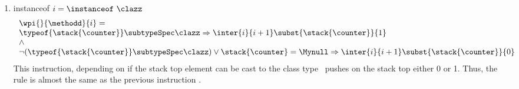 \begin{itemize}
\begin{enumerate}
						\item instanceof $i = \instanceof \  \clazz  $
						$$ \begin{array}{l}
                                                    \wpi{} {\methodd}{i}  = \\
							 \typeof{ \stack{\counter}} \subtypeSpec \clazz  \Rightarrow 
								 \inter{i}{i+1} \subst{ \stack{\counter } } {  1  } \\
									 \wedge \\
							\neg (  \typeof{\stack{\counter}} \subtypeSpec  \clazz  )  \vee  \stack{\counter} = \Mynull \Rightarrow 
							   \inter{i}{i+1} \subst{  \stack{\counter } }{ 0 } \\	  
						\end{array} 	$$
						  This instruction, depending on if the stack top element can be cast to the class type \clazz \ pushes on the stack 
						  top either 0 or 1.
						  Thus, the rule is almost the same as the previous instruction \checkcast.
					

\end{enumerate}
\end{itemize}
